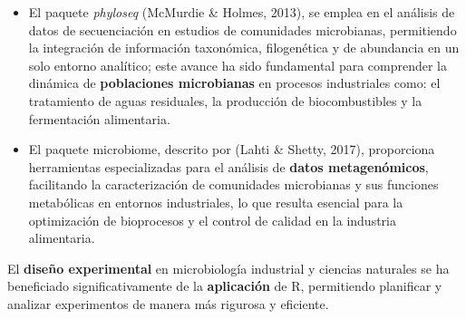\documentclass[
  spanish,
  letterpaper,
  DIV=11,
  numbers=noendperiod]{scrreprt}
\begin{document}
\begin{itemize}
\item
  El paquete \emph{phyloseq} (McMurdie \& Holmes, 2013), se emplea en el
  análisis de datos de secuenciación en estudios de comunidades
  microbianas, permitiendo la integración de información taxonómica,
  filogenética y de abundancia en un solo entorno analítico; este avance
  ha sido fundamental para comprender la dinámica de \textbf{poblaciones
  microbianas} en procesos industriales como: el tratamiento de aguas
  residuales, la producción de biocombustibles y la fermentación
  alimentaria.
\item
  El paquete microbiome, descrito por (Lahti \& Shetty, 2017),
  proporciona herramientas especializadas para el análisis de
  \textbf{datos metagenómicos}, facilitando la caracterización de
  comunidades microbianas y sus funciones metabólicas en entornos
  industriales, lo que resulta esencial para la optimización de
  bioprocesos y el control de calidad en la industria alimentaria.
\end{itemize}

El \textbf{diseño experimental} en microbiología industrial y ciencias
naturales se ha beneficiado significativamente de la \textbf{aplicación}
de R, permitiendo planificar y analizar experimentos de manera más
rigurosa y eficiente.
\end{document}
